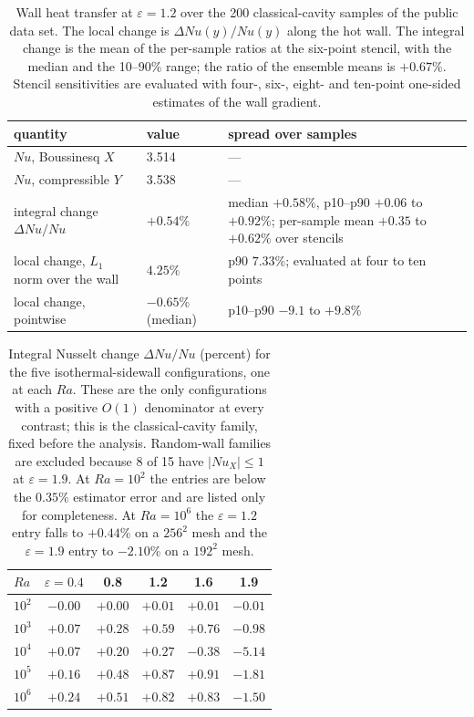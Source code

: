 \documentclass[preprint,11pt,a4paper,times]{elsarticle}
\begin{document}
\begin{table}[htbp]
\centering
\footnotesize
\setlength{\tabcolsep}{4pt}
\caption{Wall heat transfer at $\varepsilon=1.2$ over the 200 classical-cavity samples of the
public data set. The local change is $\Delta Nu(y)/Nu(y)$ along the hot wall. The integral change is
the mean of the per-sample ratios at the six-point stencil, with the median and the 10--90\% range;
the ratio of the ensemble means is $+0.67\%$. Stencil sensitivities are evaluated with four-,
six-, eight- and ten-point one-sided estimates of the wall gradient.}
\label{tab:nu}
\begin{tabular}{@{}p{4.4cm}p{2.5cm}p{5.2cm}@{}}
\toprule
quantity & value & spread over samples\\
\midrule
$Nu$, Boussinesq $X$ & 3.514 & ---\\
$Nu$, compressible $Y$ & 3.538 & ---\\
integral change $\Delta Nu/Nu$ & $+0.54\%$ & median $+0.58\%$, p10--p90 $+0.06$ to $+0.92\%$; per-sample mean $+0.35$ to $+0.62\%$ over stencils\\
local change, $L_1$ norm over the wall & $4.25\%$ & p90 $7.33\%$; evaluated at four to ten points\\
local change, pointwise & $-0.65\%$ (median) & p10--p90 $-9.1$ to $+9.8\%$\\
\bottomrule
\end{tabular}
\end{table}

\begin{table}[htbp]
\centering
\footnotesize
\setlength{\tabcolsep}{5pt}
\caption{Integral Nusselt change $\Delta Nu/Nu$ (percent) for the five isothermal-sidewall
configurations, one at each $Ra$. These are the only configurations with a positive $O(1)$
denominator at every contrast; this is the classical-cavity family, fixed before the analysis.
Random-wall families are excluded because 8 of 15 have $|Nu_X|\le1$ at $\varepsilon=1.9$. At
$Ra=10^2$ the entries are below the $0.35\%$ estimator error and are listed only for
completeness. At $Ra=10^6$ the $\varepsilon=1.2$ entry falls to $+0.44\%$ on a $256^2$ mesh and the
$\varepsilon=1.9$ entry to $-2.10\%$ on a $192^2$ mesh.}
\label{tab:nu_ra}
\begin{tabular}{@{}lccccc@{}}
\toprule
$Ra$ & $\varepsilon=0.4$ & 0.8 & 1.2 & 1.6 & 1.9\\
\midrule
$10^2$ & $-0.00$ & $+0.00$ & $+0.01$ & $+0.01$ & $-0.01$\\
$10^3$ & $+0.07$ & $+0.28$ & $+0.59$ & $+0.76$ & $-0.98$\\
$10^4$ & $+0.07$ & $+0.20$ & $+0.27$ & $-0.38$ & $-5.14$\\
$10^5$ & $+0.16$ & $+0.48$ & $+0.87$ & $+0.91$ & $-1.81$\\
$10^6$ & $+0.24$ & $+0.51$ & $+0.82$ & $+0.83$ & $-1.50$\\
\bottomrule
\end{tabular}
\end{table}
\end{document}
